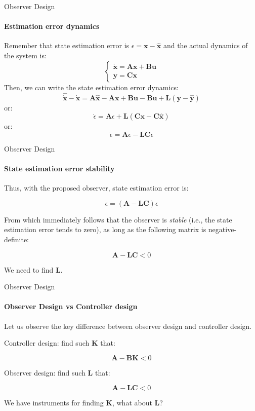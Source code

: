 \documentclass{beamer}
\begin{document}
\begin{frame}{Observer Design}
\framesubtitle{Estimation error dynamics}
\begin{flushleft}

Remember that state estimation error is $\epsilon = \mathbf x -  \hat{\mathbf x}$ and the actual dynamics of the system is:
%
\[
\begin{cases}
\dot {\mathbf x} = \mathbf A \mathbf x + 
\mathbf B \mathbf u \\
\mathbf y = \mathbf C \mathbf x 
\end{cases}
\]
%
Then, we can write the state estimation error dynamics:
%
\[
\hat{\dot {\mathbf x}} - \dot {\mathbf x} = 
\mathbf A \hat{\mathbf x} - \mathbf A \mathbf x
+ \mathbf B \mathbf u - \mathbf B \mathbf u 
+ \mathbf L(\mathbf y - \hat{\mathbf y})
\]
%
or:
%
\[
\dot {\epsilon} = \mathbf A \epsilon + 
\mathbf L(\mathbf C \mathbf x - \mathbf C \hat{\mathbf x})
\]
%
or:
%
\[
\dot {\epsilon} = \mathbf A \epsilon - 
\mathbf L \mathbf C \epsilon
\]

\end{flushleft}
\end{frame}

\begin{frame}{Observer Design}
\framesubtitle{State estimation error stability}
\begin{flushleft}

Thus, with the proposed observer, state estimation error is:

\[
\dot {\epsilon} = (\mathbf A - 
\mathbf L \mathbf C) \epsilon
\]

From which immediately follows that the observer is \emph{stable} (i.e., the state estimation error tends to zero), as long as the following matrix is negative-definite:

\[
\mathbf A - 
\mathbf L \mathbf C < 0
\]

We need to find $\mathbf L$.

\end{flushleft}
\end{frame}



\begin{frame}{Observer Design}
\framesubtitle{Observer Design vs Controller design}
\begin{flushleft}

Let us observe the key difference between observer design and controller design.

\bigskip

Controller design: find such $\mathbf K$ that:

\[
\mathbf A - 
\mathbf B \mathbf K < 0
\]

Observer design: find such $\mathbf L$ that:

\[
\mathbf A - 
\mathbf L \mathbf C < 0
\]

We have instruments for finding $\mathbf K$, what about $\mathbf L$?

\end{flushleft}
\end{frame}
\end{document}
